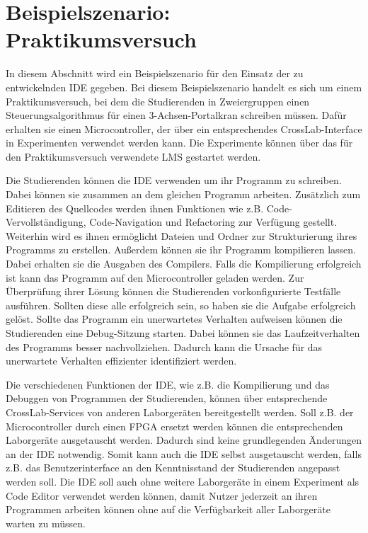 \section{Beispielszenario: Praktikumsversuch}\label{section:anforderungsanalyse:beispielszenario}

In diesem Abschnitt wird ein Beispielszenario für den Einsatz der zu entwickelnden IDE gegeben. Bei diesem Beispielszenario handelt es sich um einem Praktikumsversuch, bei dem die Studierenden in Zweiergruppen einen Steuerungsalgorithmus für einen 3-Achsen-Portalkran schreiben müssen. Dafür erhalten sie einen Microcontroller, der über ein entsprechendes CrossLab-Interface in Experimenten verwendet werden kann. Die Experimente können über das für den Praktikumsversuch verwendete \ac{LMS} gestartet werden.

Die Studierenden können die IDE verwenden um ihr Programm zu schreiben. Dabei können sie zusammen an dem gleichen Programm arbeiten. Zusätzlich zum Editieren des Quellcodes werden ihnen Funktionen wie z.B. Code-Vervollständigung, Code-Navigation und Refactoring zur Verfügung gestellt. Weiterhin wird es ihnen ermöglicht Dateien und Ordner zur Strukturierung ihres Programms zu erstellen. Außerdem können sie ihr Programm kompilieren lassen. Dabei erhalten sie die Ausgaben des Compilers. Falls die Kompilierung erfolgreich ist kann das Programm auf den Microcontroller geladen werden. Zur Überprüfung ihrer Lösung können die Studierenden vorkonfigurierte Testfälle ausführen. Sollten diese alle erfolgreich sein, so haben sie die Aufgabe erfolgreich gelöst. Sollte das Programm ein unerwartetes Verhalten aufweisen können die Studierenden eine Debug-Sitzung starten. Dabei können sie das Laufzeitverhalten des Programms besser nachvollziehen. Dadurch kann die Ursache für das unerwartete Verhalten effizienter identifiziert werden.

Die verschiedenen Funktionen der IDE, wie z.B. die Kompilierung und das Debuggen von Programmen der Studierenden, können über entsprechende CrossLab-Services von anderen Laborgeräten bereitgestellt werden. Soll z.B. der Microcontroller durch einen FPGA ersetzt werden können die entsprechenden Laborgeräte ausgetauscht werden. Dadurch sind keine grundlegenden Änderungen an der IDE notwendig. Somit kann auch die IDE selbst ausgetauscht werden, falls z.B. das Benutzerinterface an den Kenntnisstand der Studierenden angepasst werden soll. Die IDE soll auch ohne weitere Laborgeräte in einem Experiment als Code Editor verwendet werden können, damit Nutzer jederzeit an ihren Programmen arbeiten können ohne auf die Verfügbarkeit aller Laborgeräte warten zu müssen.
